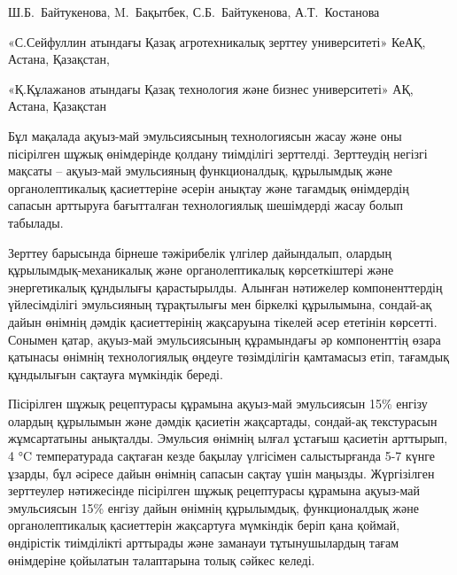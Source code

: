 
\begin{header}

Ш.Б.~Байтукенова\envelope,
M.~Бақытбек,
С.Б.~Байтукенова,
А.Т.~Костанова
\end{header}

\begin{affil}
«С.Сейфуллин атындағы Қазақ агротехникалық зерттеу университеті» КеАҚ, Астана, Қазақстан,

«Қ.Құлажанов атындағы Қазақ технология және бизнес университеті» АҚ, Астана, Қазақстан

\end{affil}

Бұл мақалада ақуыз-май эмульсиясының технологиясын жасау және оны
пісірілген шұжық өнімдерінде қолдану тиімділігі зерттелді. Зерттеудің
негізгі мақсаты -- ақуыз-май эмульсияның функционалдық, құрылымдық және
органолептикалық қасиеттеріне әсерін анықтау және тағамдық өнімдердің
сапасын арттыруға бағытталған технологиялық шешімдерді жасау болып
табылады.

Зерттеу барысында бірнеше тәжірибелік үлгілер дайындалып, олардың
құрылымдық-механика\-лық және органолептикалық көрсеткіштері және
энергетикалық құндылығы қарастырылды. Алынған нәтижелер компоненттердің
үйлесімділігі эмульсияның тұрақтылығы мен біркелкі құрылымына, сондай-ақ
дайын өнімнің дәмдік қасиеттерінің жақсаруына тікелей әсер ететінін
көрсетті. Сонымен қатар, ақуыз-май эмульсиясының құрамындағы әр
компоненттің өзара қатынасы өнімнің технологиялық өңдеуге төзімділігін
қамтамасыз етіп, тағамдық құндылығын сақтауға мүмкіндік береді.

Пісірілген шұжық рецептурасы құрамына ақуыз-май эмульсиясын 15\% енгізу
олардың құрылымын және дәмдік қасиетін жақсартады, сондай-ақ текстурасын
жұмсартатыны анықталды. Эмульсия өнімнің ылғал ұстағыш қасиетін
арттырып, 4 °C температурада сақтаған кезде бақылау үлгісімен
салыстырғанда 5-7 күнге ұзарды, бұл әсіресе дайын өнімнің сапасын сақтау
үшін маңызды. Жүргізілген зерттеулер нәтижесінде пісірілген шұжық
рецептурасы құрамына ақуыз-май эмульсиясын 15\% енгізу дайын өнімнің
құрылымдық, функционалдық және органолептикалық қасиеттерін жақсартуға
мүмкіндік беріп қана қоймай, өндірістік тиімділікті арттырады және
заманауи тұтынушылардың тағам өнімдеріне қойылатын талаптарына толық
сәйкес келеді.


